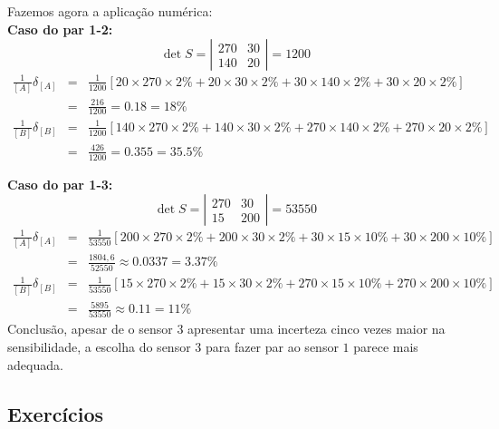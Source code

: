 \begin{resol}
Fazemos agora a aplicação numérica:\\
{\bf Caso do par 1-2:}
\begin{equation} \det{S}=\left|\begin{matrix}270&30\\140&20\end{matrix}\right|=1200 \end{equation}
\begin{eqnarray*}
\frac{1}{[A]}\delta_{[A]}
&=&\frac{1}{1200}\left[20\times 270\times 2\%+20\times 30\times 2\%+30\times 140\times 2\%+30\times 20\times 2\%\right]\\&=&\frac{216}{1200}=0.18=18\%\\
\frac{1}{[B]}\delta_{[B]}
&=&\frac{1}{1200}\left[140\times 270\times 2\%+140\times 30\times 2\%+270\times 140\times 2\%+270\times 20\times 2\%\right]\\&=&\frac{426}{1200}=0.355=35.5\%
\end{eqnarray*}

{\bf Caso do par 1-3:}
\begin{equation} \det{S}=\left|\begin{array}{cc}270&30\\15&200\end{array}\right|=53550 \end{equation}
\begin{eqnarray*}
\frac{1}{[A]}\delta_{[A]}
&=&\frac{1}{53550}\left[200\times 270\times 2\%+200\times 30\times 2\%+30\times 15\times 10\%+30\times 200\times 10\%\right]\\&=&\frac{1804,6}{52550}\approx 0.0337=3.37\%\\
\frac{1}{[B]}\delta_{[B]}
&=&\frac{1}{53550}\left[15\times 270\times 2\%+15\times 30\times 2\%+270\times 15\times 10\%+270\times 200\times 10\%\right]\\&=&	\frac{5895}{53550}\approx   0.11=11\%
\end{eqnarray*}
Conclusão, apesar de o sensor $3$ apresentar uma incerteza cinco vezes maior na sensibilidade, a escolha do sensor $3$ para fazer par ao sensor $1$ parece mais adequada.
\end{resol}


\subsection*{Exercícios}

